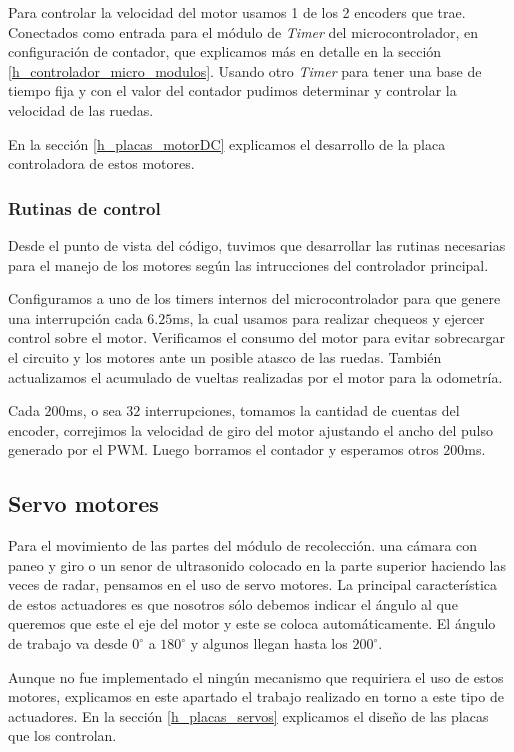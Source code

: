 Para controlar la velocidad del motor usamos 1 de los 2 encoders que trae.
Conectados como entrada para el m\'odulo de \emph{Timer} del microcontrolador, en configuraci\'on de contador, que explicamos m\'as en detalle en la
secci\'on \ref{h_controlador_micro_modulos}.
Usando otro \emph{Timer} para tener una base de tiempo fija y con el valor del contador pudimos determinar y controlar la velocidad de las ruedas.

En la secci\'on \ref{h_placas_motorDC} explicamos el desarrollo de la placa controladora de estos motores.

\subsubsection{Rutinas de control}
\label{h_actuadores_motorDC_rutinas}

Desde el punto de vista del c\'odigo, tuvimos que desarrollar las rutinas necesarias para el manejo de los motores seg\'un las intrucciones del
controlador principal.

Configuramos a uno de los timers internos del microcontrolador para que genere una interrupci\'on cada $6.25$ms, la cual usamos para realizar
chequeos y ejercer control sobre el motor.
Verificamos el consumo del motor para evitar sobrecargar el circuito y los motores ante un posible atasco de las ruedas.
Tambi\'en actualizamos el acumulado de vueltas realizadas por el motor para la odometr\'ia.

Cada $200$ms, o sea $32$ interrupciones, tomamos la cantidad de cuentas del encoder, correjimos la velocidad de giro del motor ajustando el
ancho del pulso generado por el PWM.
Luego borramos el contador y esperamos otros $200$ms.

\subsection{Servo motores}
\label{h_actuadores_servo}

Para el movimiento de las partes del m\'odulo de recolecci\'on. una c\'amara con paneo y giro o un senor de ultrasonido colocado
en la parte superior haciendo las veces de radar, pensamos en el uso de servo motores.
La principal caracter\'istica de estos actuadores es que nosotros s\'olo debemos indicar el \'angulo al que queremos que este
el eje del motor y este se coloca autom\'aticamente.
El \'angulo de trabajo va desde $0^{\circ}$ a $180^{\circ}$ y algunos llegan hasta los $200^{\circ}$.

Aunque no fue implementado el ning\'un mecanismo que requiriera el uso de estos motores, explicamos en este apartado el trabajo realizado
en torno a este tipo de actuadores.
En la secci\'on \ref{h_placas_servos} explicamos el dise\~no de las placas que los controlan.

